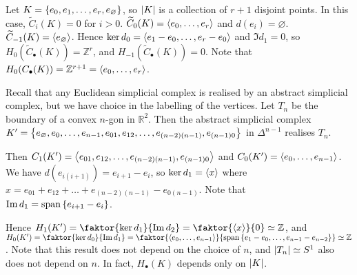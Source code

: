\begin{example}
	Let \( K = \qty{e_0, e_1, \dots, e_r, e_\varnothing} \), so \( \abs{K} \) is a collection of \( r + 1 \) disjoint points.
	In this case, \( \widetilde C_i(K) = 0 \) for \( i > 0 \).
	\( \widetilde C_0(K) = \left\langle{} e_0, \dots, e_r \right\rangle \) and \( d(e_i) = \varnothing \).
	\( \widetilde C_{-1}(K) = \left\langle{} e_\varnothing \right\rangle \).
	Hence \( \ker d_0 = \left\langle{} e_1-e_0, \dots, e_r-e_0 \right\rangle \) and \( \Im d_1 = 0 \), so \( H_0(\widetilde C_\bullet(K)) = \mathbb Z^r \), and \( H_{-1}(\widetilde C_\bullet(K)) = 0 \).
	Note that \( H_0(C_\bullet(K)) = \mathbb Z^{r+1} = \left\langle{} e_0, \dots, e_r \right\rangle \).
\end{example}
\begin{example}
	Recall that any Euclidean simplicial complex is realised by an abstract simplicial complex, but we have choice in the labelling of the vertices.
	Let \( T_n \) be the boundary of a convex \( n \)-gon in \( \mathbb R^2 \).
	Then the abstract simplicial complex \( K' = \qty{e_\varnothing, e_0, \dots, e_{n-1}, e_{01}, e_{12}, \dots, e_{(n-2)(n-1)}, e_{(n-1)0}} \) in \( \Delta^{n-1} \) realises \( T_n \).

	Then \( C_1(K') = \left\langle{} e_{01}, e_{12}, \dots, e_{(n-2)(n-1)}, e_{(n-1)0} \right\rangle \) and \( C_0(K') = \left\langle{} e_0, \dots, e_{n-1} \right\rangle \).
	We have \( d(e_{i(i+1)}) = e_{i+1} - e_i \), so \( \ker d_1 = \left\langle{} x \right\rangle \) where \( x = e_{01} + e_{12} + \dots + e_{(n-2)(n-1)} - e_{0(n-1)} \).
	Note that \( \Im d_1 = \operatorname{span}\qty{e_{i+1} - e_i} \).

	Hence \( H_1(K') = \faktor{\ker d_1}{\Im d_2} = \faktor{\genset{x}}{0} \simeq \mathbb Z \), and \( H_0(K') = \faktor{\ker d_0}{\Im d_1} = \faktor{\genset{e_0, \dots, e_{n-1}}}{\vecspan\qty{e_1 - e_0, \dots, e_{n-1} - e_{n-2}}} \simeq \mathbb Z \).
	Note that this result does not depend on the choice of \( n \), and \( \abs{T_n} \simeq S^1 \) also does not depend on \( n \).
	In fact, \( H_\bullet(K) \) depends only on \( \abs{K} \).
\end{example}

